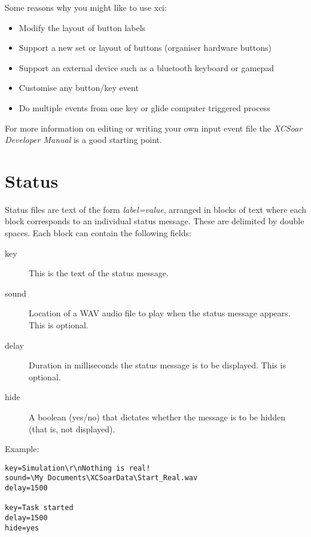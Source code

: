 Some reasons why you might like to use xci:
\begin{itemize}
\item Modify the layout of button labels
\item Support a new set or layout of buttons (organiser hardware buttons)
\item Support an external device such as a bluetooth keyboard or gamepad
\item Customise any button/key event
\item Do multiple events from one key or glide computer triggered process
\end{itemize}
For more information on editing or writing your own input event
file the {\em XCSoar Developer Manual} is a good starting point.


\section{Status}\label{sec:status-file}

Status files are text of the form {\em label=value}, arranged in
blocks of text where each block corresponds to an individual status
message.  These are delimited by double spaces.  Each block can
contain the following fields:
\begin{description}
\item[key]  This is the text of the status message.
\item[sound] Location of a WAV audio file to play when the status
  message appears.  This is optional.
\item[delay] Duration in milliseconds the status message is
  to be displayed.  This is optional.
\item[hide] A boolean (yes/no) that dictates whether the message
 is to be hidden (that is, not displayed). 
\end{description} 

Example:
\begin{verbatim}
key=Simulation\r\nNothing is real!
sound=\My Documents\XCSoarData\Start_Real.wav
delay=1500

key=Task started
delay=1500
hide=yes
\end{verbatim}
% 

